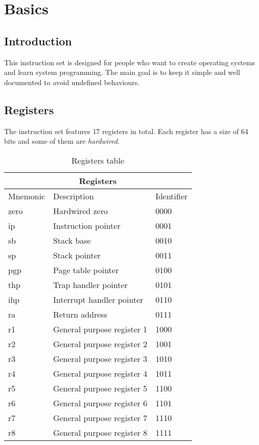\documentclass{article}
\begin{document}
\section{Basics}
\subsection{Introduction}
This instruction set is designed for people who want to create operating systems and learn system programming. The main goal is to keep it simple and well documented to avoid undefined behaviours.

\subsection{Registers}
The instruction set features 17 registers in total. Each register has a size of 64 bits and some of them are \textit{hardwired}.
\begin{table}[h!]
  \centering
  \begin{tabular} { | p{3cm} | | p{6cm} | p{2cm} |}
    \hline
    \multicolumn{3}{|c|}{Registers}\\
    \hline
    Mnemonic & Description & Identifier\\
    \hline
    zero & Hardwired zero & 0000\\
    ip & Instruction pointer & 0001\\
    sb & Stack base & 0010\\
    sp & Stack pointer & 0011\\
    pgp & Page table pointer & 0100\\
    thp & Trap handler pointer & 0101\\
    ihp & Interrupt handler pointer & 0110\\
    ra & Return address & 0111\\
    r1 & General purpose register 1 & 1000\\
    r2 & General purpose register 2 & 1001\\
    r3 & General purpose register 3 & 1010\\
    r4 & General purpose register 4 & 1011\\
    r5 & General purpose register 5 & 1100\\
    r6 & General purpose register 6 & 1101\\
    r7 & General purpose register 7 & 1110\\
    r8 & General purpose register 8 & 1111\\
    \hline
  \end{tabular}
  \caption{Registers table}
\end{table}
\end{document}
